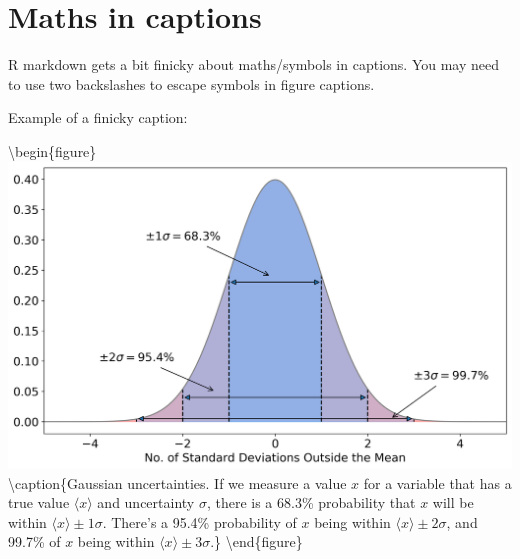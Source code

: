 \documentclass[]{book}
\newenvironment{Shaded}{\begin{snugshade}}{\end{snugshade}}
\newcommand{\BaseNTok}[1]{\textcolor[rgb]{0.00,0.00,0.81}{#1}}
\begin{document}
\hypertarget{sec:maths-captions}{%
\section{Maths in captions}\label{sec:maths-captions}}

R markdown gets a bit finicky about maths/symbols in captions. You may need to use two backslashes to escape symbols in figure captions.

Example of a finicky caption:

\begin{Shaded}
\end{Shaded}

\textbackslash{}begin\{figure\}
\includegraphics[width=1\linewidth]{Images/normal-curve} \textbackslash{}caption\{Gaussian uncertainties. If we measure a value \(x\) for a variable that has a true value \(\langle x \rangle\) and uncertainty \(\sigma\), there is a 68.3\% probability that \(x\) will be within \(\langle x \rangle \pm 1\sigma\). There's a 95.4\% probability of \(x\) being within \(\langle x \rangle \pm 2\sigma\), and 99.7\% of \(x\) being within \(\langle x \rangle \pm 3\sigma\).\}\label{fig:gaussian}
\textbackslash{}end\{figure\}
\end{document}
